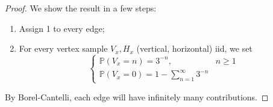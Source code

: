\begin{proof}
    We show the result in a few steps:
    \begin{enumerate}[1.]
      \item Assign 1 to every edge;
      \item For every vertex sample \(V_x, H_x\) (vertical, horizontal) iid, we set 
        \[
        \begin{cases}
          \mathbb{P} \left(V_x=n\right)=3^{-n}, &  n \geq 1 \\
          \mathbb{P} \left(V_x=0\right)= 1- \sum_{n=1}^{\infty} 3^{-n} 
        \end{cases}
        \]
    \end{enumerate}
   By Borel-Cantelli, each edge will have infinitely many contributions.  
\end{proof}

